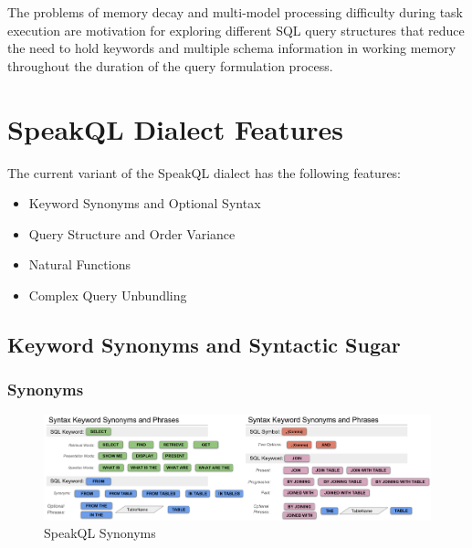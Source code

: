 The problems of memory decay and multi-model processing difficulty during task execution are motivation
for exploring different SQL query structures that reduce the need to hold keywords and multiple schema information 
in working memory throughout the duration of the query formulation process.


\section{SpeakQL Dialect Features}


The current variant of the SpeakQL dialect has the following features:

\begin{itemize}
  \item Keyword Synonyms and Optional Syntax
  \item Query Structure and Order Variance
  \item Natural Functions
  \item Complex Query Unbundling
\end{itemize}

\subsection{Keyword Synonyms and Syntactic Sugar}



\subsubsection{Synonyms}

\begin{figure}
  \centering
  \includegraphics[width=\textwidth]{figures/all_synonyms.png}
  \caption{SpeakQL Synonyms}
\end{figure}

